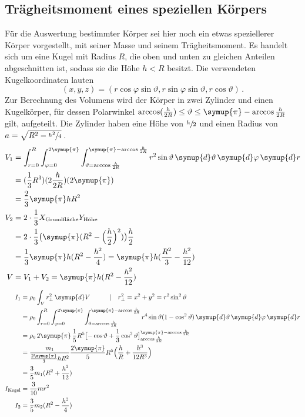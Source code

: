 \subsection{Trägheitsmoment eines speziellen Körpers}

Für die Auswertung bestimmter Körper sei hier noch ein etwas speziellerer Körper vorgestellt, mit seiner Masse und seinem 
Trägheitsmoment. 
Es handelt sich um eine Kugel mit Radius $R$, die oben und unten zu gleichen Anteilen \glqq abgeschnitten\grqq{} ist, sodass 
sie die Höhe ${h<R}$ besitzt. 
Die verwendeten Kugelkoordinaten lauten 
\begin{equation}
    (x,y,z)=(r\cos \varphi \sin \vartheta, r\sin \varphi \sin \vartheta, r\cos \vartheta) \,.
\end{equation}
Zur Berechnung des Volumens wird der Körper in zwei Zylinder und einen Kugelkörper, für dessen Polarwinkel 
${\arccos (\frac{h}{2R})\le\vartheta\le\symup{\pi}-\arccos{\frac{h}{2R}}}$ gilt, aufgeteilt. 
Die Zylinder haben eine Höhe von ${\sfrac{h}{2}}$ und einen Radius von ${a=\sqrt{R^2-\sfrac{h^2}{4}}}\,$. 
\begin{align}
    V_1&=\int_{r=0}^R \int_{\varphi=0}^{2\symup{\pi}} \int_{\vartheta=\arccos{\frac{h}{2R}}}^{\symup{\pi}-\arccos{\frac{h}{2R}}} 
        r^2\sin{\vartheta} \, \symup{d}\vartheta \, \symup{d}\varphi \, \symup{d}r \\
        &= (\frac{1}{3}R^3) (2\frac{h}{2R}) (2\symup{\pi}) \\
        &= \frac{2}{3}\symup{\pi}hR^2 \\
    V_2&= 2\cdot\frac{1}{3} X_\text{Grundfläche} Y_\text{Höhe} \\
        &= 2\cdot\frac{1}{3} \bigl(\symup{\pi} (R^2-\Bigl(\frac{h}{2}\Bigr)^2)\bigr) \frac{h}{2} \\
        &= \frac{1}{3}\symup{\pi}h(R^2-\frac{h^2}{4}) = \symup{\pi}h(\frac{R^2}{3}-\frac{h^2}{12}) \\
    V&=V_1+V_2=\symup{\pi}h(R^2-\frac{h^2}{12})
\end{align}
\begin{align}
    I_1&=\rho _0 \int_V r_{\perp}^2 \, \symup{d}V 
        \quad \quad \quad |\quad r_{\perp}^2=x^2+y^2=r^2\sin ^2\vartheta \\
        &= \rho _0  \int_{r=0}^R \int_{\varphi=0}^{2\symup{\pi}} \int_{\vartheta=\arccos{\frac{h}{2R}}}^{\symup{\pi}-\arccos{\frac{h}{2R}}} 
        r^4\sin{\vartheta}(1-\cos ^2\vartheta) \, \symup{d}\vartheta \, \symup{d}\varphi \, \symup{d}r \\
        &= \rho _0 \, 2\symup{\pi} \, \frac{1}{5} R^5 \bigl[-\cos{\vartheta}+\frac{1}{3}\cos ^2\vartheta\bigr]_{\arccos \frac{h}{2R}}^{\symup{\pi}-\arccos \frac{h}{2R}} \\
        &= \frac{m_1}{\frac{2\symup{\pi}}{3}hR^2} \frac{2\symup{\pi}}{5} R^5 \Bigl(\frac{h}{R} + \frac{h^3}{12R^3}\Bigr) \\
        &= \frac{3}{5}m_1(R^2+\frac{h^2}{12}) \\
    I_\text{Kegel}&=\frac{3}{10}mr^2 \\
    I_2&=\frac{3}{5}m_2(R^2-\frac{h^2}{4}) \\
\end{align}

